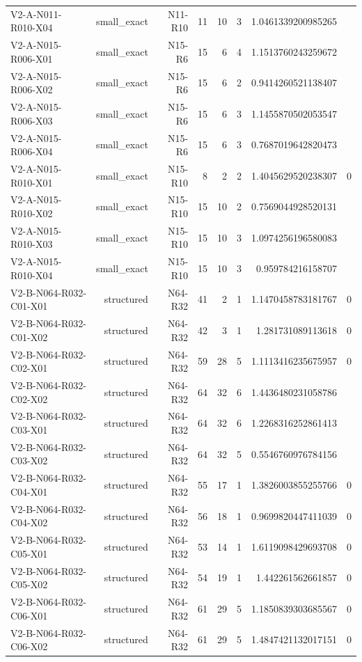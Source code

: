 {\begin{longtable}{lrrrrrrr}
V2-A-N011-R010-X04 & small\_exact & N11-R10 & 11 & 10 & 3 & 1.0461339200985265 &  \\
V2-A-N015-R006-X01 & small\_exact & N15-R6 & 15 & 6 & 4 & 1.1513760243259672 &  \\
V2-A-N015-R006-X02 & small\_exact & N15-R6 & 15 & 6 & 2 & 0.9414260521138407 &  \\
V2-A-N015-R006-X03 & small\_exact & N15-R6 & 15 & 6 & 3 & 1.1455870502053547 &  \\
V2-A-N015-R006-X04 & small\_exact & N15-R6 & 15 & 6 & 3 & 0.7687019642820473 &  \\
V2-A-N015-R010-X01 & small\_exact & N15-R10 & 8 & 2 & 2 & 1.4045629520238307 & 0 \\
V2-A-N015-R010-X02 & small\_exact & N15-R10 & 15 & 10 & 2 & 0.7569044928520131 &  \\
V2-A-N015-R010-X03 & small\_exact & N15-R10 & 15 & 10 & 3 & 1.0974256196580083 &  \\
V2-A-N015-R010-X04 & small\_exact & N15-R10 & 15 & 10 & 3 & 0.959784216158707 &  \\
V2-B-N064-R032-C01-X01 & structured & N64-R32 & 41 & 2 & 1 & 1.1470458783181767 & 0 \\
V2-B-N064-R032-C01-X02 & structured & N64-R32 & 42 & 3 & 1 & 1.281731089113618 & 0 \\
V2-B-N064-R032-C02-X01 & structured & N64-R32 & 59 & 28 & 5 & 1.1113416235675957 & 0 \\
V2-B-N064-R032-C02-X02 & structured & N64-R32 & 64 & 32 & 6 & 1.4436480231058786 &  \\
V2-B-N064-R032-C03-X01 & structured & N64-R32 & 64 & 32 & 6 & 1.2268316252861413 &  \\
V2-B-N064-R032-C03-X02 & structured & N64-R32 & 64 & 32 & 5 & 0.5546760976784156 &  \\
V2-B-N064-R032-C04-X01 & structured & N64-R32 & 55 & 17 & 1 & 1.3826003855255766 & 0 \\
V2-B-N064-R032-C04-X02 & structured & N64-R32 & 56 & 18 & 1 & 0.9699820447411039 & 0 \\
V2-B-N064-R032-C05-X01 & structured & N64-R32 & 53 & 14 & 1 & 1.6119098429693708 & 0 \\
V2-B-N064-R032-C05-X02 & structured & N64-R32 & 54 & 19 & 1 & 1.442261562661857 & 0 \\
V2-B-N064-R032-C06-X01 & structured & N64-R32 & 61 & 29 & 5 & 1.1850839303685567 & 0 \\
V2-B-N064-R032-C06-X02 & structured & N64-R32 & 61 & 29 & 5 & 1.4847421132017151 & 0 \\

\end{longtable}}

